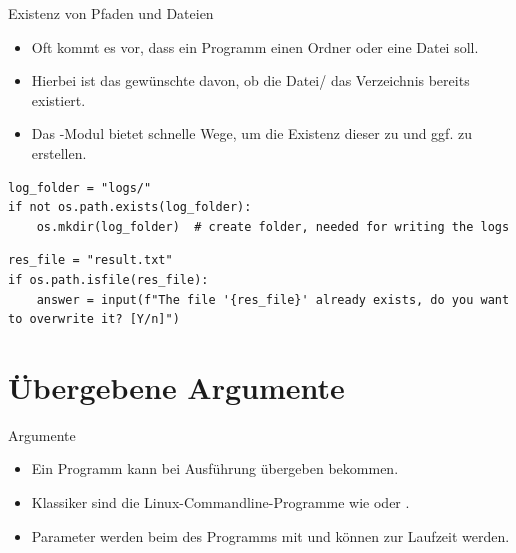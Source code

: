 \documentclass[12pt, aspectratio=169, usepdftitle=false]{beamer}
\newcommand{\pp}[1]{\lpl{#1}}
\begin{document}
\begin{frame}[fragile]{Existenz von Pfaden und Dateien}
	\begin{itemize}
		\item Oft kommt es vor, dass ein Programm einen Ordner oder eine Datei  soll.
		\pause
		\item Hierbei ist das gewünschte  davon, ob die Datei/ das Verzeichnis bereits existiert.
		\pause
		\item Das \pp{os}-Modul bietet schnelle Wege, um die Existenz dieser zu  und ggf. zu erstellen.
	\end{itemize}
	\begin{lstlisting}[language=pytiny]
log_folder = "logs/"
if not os.path.exists(log_folder):
    os.mkdir(log_folder)  # create folder, needed for writing the logs 
	\end{lstlisting}
    \begin{lstlisting}[language=pytiny]
res_file = "result.txt"
if os.path.isfile(res_file):
    answer = input(f"The file '{res_file}' already exists, do you want to overwrite it? [Y/n]")
\end{lstlisting}
\end{frame}

\framecardfragen


\section{Übergebene Argumente}

\begin{frame}{Argumente}
	\begin{itemize}
		\item Ein Programm kann bei Ausführung  übergeben bekommen.
		\pause
		\item Klassiker sind die Linux-Commandline-Programme wie \pp{cd} oder \pp{cp}.
		\pause
		\item Parameter werden beim  des Programms mit  und können zur Laufzeit  werden.
	\end{itemize}
\end{frame}
\end{document}
